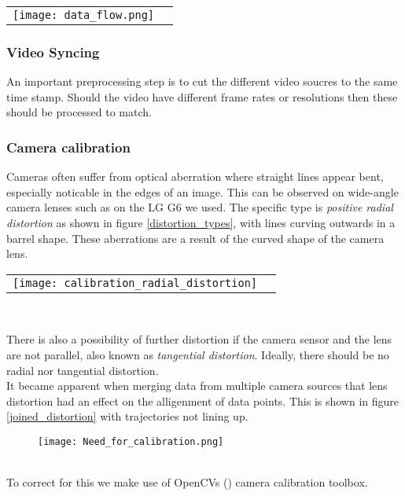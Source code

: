 \raggedbottom
\begin{tabular}{@{}cc}
\texttt{[image: data\_flow.png]} 
\end{tabular}
\label{data}
\raggedbottom

\subsubsection{Video Syncing}
An important preprocessing step is to cut the different video soucres to the same time stamp.
Should the video have different frame rates or resolutions then these should be processed to match.

\subsubsection{Camera calibration}
Cameras often suffer from optical aberration where straight lines appear bent, especially noticable in the edges of an image. 
This can be observed on wide-angle camera lenses such as on the LG G6 we used.
The specific type is \textit{positive radial distortion} as shown in figure \ref{distortion_types}, with lines curving outwards in a barrel shape.
These aberrations are a result of the curved shape of the camera lens.
\ \\ 

\raggedbottom
\begin{tabular}{@{}cc}
\texttt{[image: calibration\_radial\_distortion]} 
\end{tabular}
\label{distortion_types}
\

There is also a possibility of further distortion if the camera sensor and the lens are not parallel, also known as \textit{tangential distortion}.
Ideally, there should be no radial nor tangential distortion.
\ \\
It became apparent when merging data from multiple camera sources that lens distortion had an effect on the alligenment of data points.
This is shown in figure \ref{joined_distortion} with trajectories not lining up.

\begin{figure}[h]
  \texttt{[image: Need\_for\_calibration.png]}
  \centering 
  \end{figure}
  \label{joined_distortion}
\ \\

To correct for this we make use of OpenCVs (\cite{noauthor_opencv/opencv_2021}) camera calibration toolbox.

